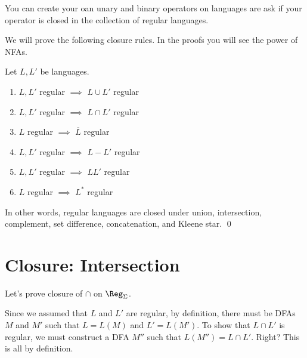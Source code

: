 You can create your oan unary and binary operators on languages are ask
if your operator is closed in the collection of regular languages.

 
We will prove the following closure rules. In the proofs you will
see the power of NFAs.



\begin{thm}
 Let $L,L'$ be languages.
 \begin{enumerate}[label=\textnormal{(\alph*)},itemsep=0pt,nosep,noitemsep,partopsep=0pt,topsep=0pt,parsep=0pt]
  \item $L,L'$ regular $\implies$ $L \cup L'$ regular
  \item $L,L'$ regular $\implies$ $L \cap L'$ regular
  \item $L$ regular $\implies$ $\overline{L}$ regular
  \item $L,L'$ regular $\implies$ $L - L'$ regular
  \item $L,L'$ regular $\implies$ $LL'$ regular
  \item $L$ regular $\implies$ $L^*$ regular
 \end{enumerate}
 In other words, regular languages
 are closed under union, intersection, complement, set difference,
 concatenation, and Kleene star.
 \qed
\end{thm}





\newpage
\section{Closure: Intersection}

Let's prove closure of $\cap$ on $\Reg_\Sigma$.

Since we assumed that $L$ and $L'$ are regular, by definition,
there must be DFAs $M$ and $M'$ such that $L = L(M)$ and $L' =
L(M')$. To show that $L \cap L'$ is regular, we must construct a
DFA $M''$ such that $L(M'') = L\cap L'$. Right? This is all by
definition.

